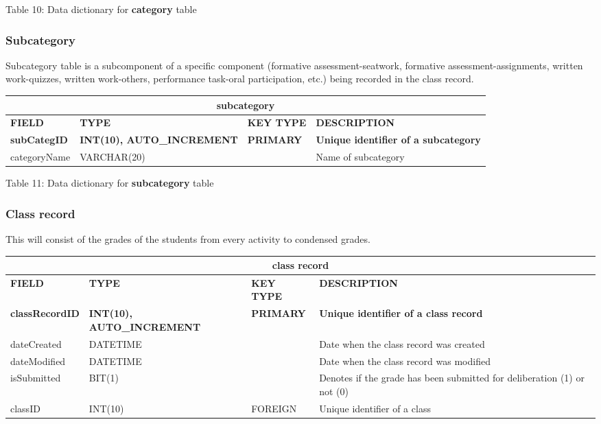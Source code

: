 \documentclass[11pt,a4paper,titlepage]{article}
\begin{document}
\vspace{.5cm}
\begin{center}
    Table 10: Data dictionary for \textbf{category} table
\end{center}


\subsubsection{Subcategory}

Subcategory table is a subcomponent of a specific component (formative assessment-seatwork, formative assessment-assignments, written work-quizzes, written work-others, performance task-oral participation, etc.) being recorded in the class record.

\vspace{1cm}
\begin{longtable}{ |p{2.5cm}|p{4.5cm}|p{2.5cm}|p{3cm}|  }
    \hline
    \multicolumn{4}{|c|}{\textbf{subcategory}} \\
    \hline
    \textbf{FIELD}&\textbf{TYPE}&\textbf{KEY TYPE}&\textbf{DESCRIPTION}\\
    \hline
    \textbf{subCategID}  & \textbf{INT(10), AUTO\_INCREMENT} & \textbf{PRIMARY} & \textbf{Unique identifier of a subcategory}\\ \hline
    categoryName & VARCHAR(20) & & Name of subcategory \\ \hline
\end{longtable}

\vspace{.5cm}
\begin{center}
    Table 11: Data dictionary for \textbf{subcategory} table
\end{center}


\subsubsection{Class record}

This will consist of the grades of the students from every activity to condensed grades.

\vspace{1cm}
\begin{longtable}{ |p{2.5cm}|p{4.5cm}|p{2.5cm}|p{3cm}|  }
    \hline
    \multicolumn{4}{|c|}{\textbf{class record}} \\
    \hline
    \textbf{FIELD}&\textbf{TYPE}&\textbf{KEY TYPE}&\textbf{DESCRIPTION}\\
    \hline
    \textbf{classRecordID}  & \textbf{INT(10), AUTO\_INCREMENT} & \textbf{PRIMARY} & \textbf{Unique identifier of a class record}\\ \hline
    dateCreated   & DATETIME   & & Date when the class record was created\\ \hline
    dateModified  & DATETIME   & & Date when the class record was modified\\ \hline
    isSubmitted   & BIT(1)   & & Denotes if the grade has been submitted for deliberation (1) or not (0)\\ \hline
    classID   & INT(10)   & FOREIGN & Unique identifier of a class\\ \hline
\end{longtable}
    
\end{document}
